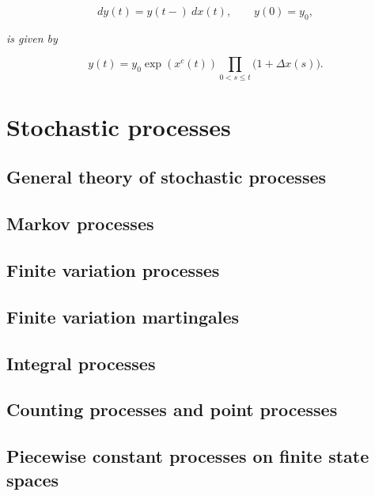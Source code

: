 \documentclass[a4paper,12pt,openany]{book}
\begin{document}
\[
dy(t)=y(t-)\ dx(t),\qquad y(0)=y_0,
\]

\emph{is given by}

\[
y(t)=y_0\exp(x^c(t))\prod_{0<s\le t}\big(1+\Delta x(s)\big).
\]

\hypertarget{stochastic-processes}{%
\section{Stochastic processes}\label{stochastic-processes}}

\hypertarget{general-theory-of-stochastic-processes}{%
\subsection{General theory of stochastic processes}\label{general-theory-of-stochastic-processes}}

\hypertarget{markov-processes}{%
\subsection{Markov processes}\label{markov-processes}}

\hypertarget{finite-variation-processes}{%
\subsection{Finite variation processes}\label{finite-variation-processes}}

\hypertarget{finite-variation-martingales}{%
\subsection{Finite variation martingales}\label{finite-variation-martingales}}

\hypertarget{integral-processes}{%
\subsection{Integral processes}\label{integral-processes}}

\hypertarget{counting-processes-and-point-processes}{%
\subsection{Counting processes and point processes}\label{counting-processes-and-point-processes}}

\hypertarget{piecewise-constant-processes-on-finite-state-spaces}{%
\subsection{Piecewise constant processes on finite state spaces}\label{piecewise-constant-processes-on-finite-state-spaces}}
\end{document}
